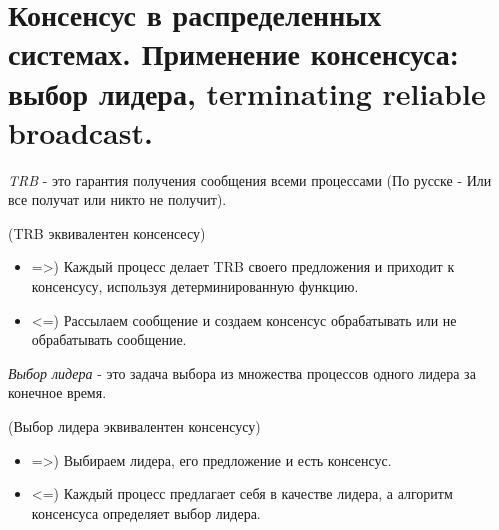 \section{Консенсус в распределенных системах. Применение консенсуса: выбор лидера, terminating reliable broadcast.}

\begin{definition}
    \textit{TRB} - это гарантия получения сообщения всеми процессами (По русске - Или все получат или никто не получит). 
\end{definition}

\begin{algorithm} (TRB эквивалентен консенсесу)
    \begin{itemize}
    \item =>) Каждый процесс делает TRB своего предложения и приходит к консенсусу, используя детерминированную функцию. 
    \item <=) Рассылаем сообщение и создаем консенсус обрабатывать или не обрабатывать сообщение.
    \end{itemize}
\end{algorithm}

\begin{definition}
    \textit{Выбор лидера} - это задача выбора из множества процессов одного лидера за конечное время.
\end{definition}

\begin{algorithm} (Выбор лидера эквивалентен консенсусу)
    \begin{itemize}
    \item =>) Выбираем лидера, его предложение и есть консенсус.
    \item <=) Каждый процесс предлагает себя в качестве лидера, а алгоритм консенсуса определяет выбор лидера.
    \end{itemize}
\end{algorithm}